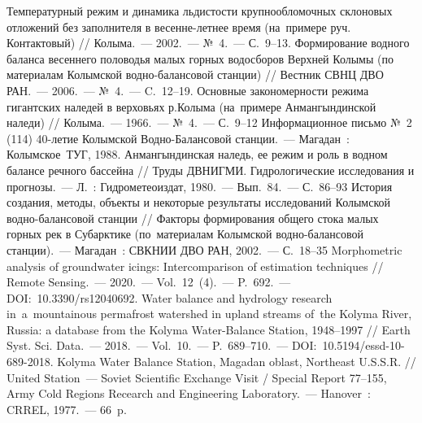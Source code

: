 \begin{thebibliography}{99}
\bibitem{} Температурный режим и динамика льдистости крупнообломочных склоновых отложений без заполнителя в весенне-летнее время (на~примере руч. Контактовый) // Колыма.~--- 2002.~--- №~4.~--- С.~9--13.
\bibitem{} Формирование водного баланса весеннего половодья малых горных водосборов Верхней Колымы (по материалам Колымской водно-балансовой станции) // Вестник СВНЦ ДВО РАН.~--- 2006.~--- №~4.~--- C.~12--19.
\bibitem{} Основные закономерности режима гигантских наледей в верховьях р.Колыма (на~примере Анмангындинской наледи) // Колыма.~--- 1966.~--- №~4.~--- С.~9--12
\bibitem{}Информационное письмо №~2\,(114) 40-летие Колымской Водно-Балансовой станции.~--- Магадан~:  Колымское~ТУГ, 1988.
\bibitem{} Анмангындинская наледь, ее режим и роль в водном балансе речного бассейна // Труды ДВНИГМИ. Гидрологические исследования и прогнозы.~--- Л.~: Гидрометеоиздат, 1980.~--- Вып.~84.~--- С.~86--93
\bibitem{} История создания, методы, объекты и некоторые результаты исследований Колымской водно-балансовой станции // Факторы формирования общего стока малых горных рек в Субарктике (по~материалам Колымской водно-балансовой станции).~--- Магадан~: СВКНИИ ДВО РАН, 2002.~--- С.~18--35
\bibitem{} Morphometric analysis of groundwater icings: Intercomparison of estimation techniques // Remote Sensing.~--- 2020.~--- Vol.~12~(4).~--- P.~692.~--- DOI:~10.3390/rs12040692.
\bibitem{} Water balance and hydrology research in~a~mountainous permafrost watershed in upland streams of~the Kolyma River, Russia: a database from the Kolyma Water-Balance Station, 1948–1997 // Earth Syst. Sci. Data.~--- 2018.~--- Vol.~10.~--- P.~689--710.~--- DOI:~10.5194/essd-10-689-2018.
\bibitem{} Kolyma Water Balance Station, Magadan oblast, Northeast U.S.S.R. // United Station~--- Soviet Scientific Exchange Visit / Special Report 77--155, Army Cold Regions Recearch and Engineering Laboratory.~--- Hanover~: CRREL, 1977.~--- 66~p.
\end{thebibliography}
